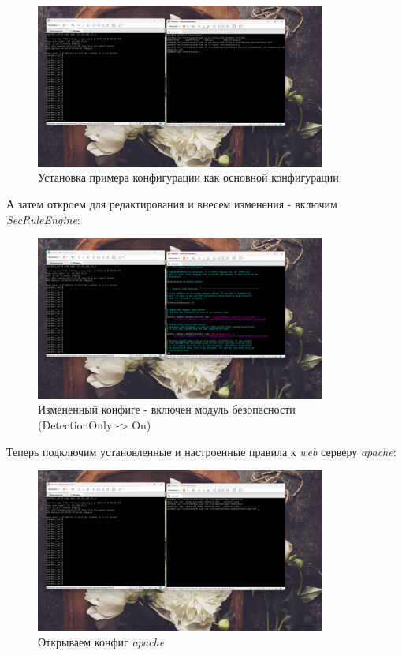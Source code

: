 \documentclass[a4paper]{article}
\begin{document}
  \begin{figure}[H]
    \centering
    \includegraphics[width=0.85\textwidth]{03_00 (56)}
    \caption{Установка примера конфигурации как основной конфигурации}
    \label{img:56}
  \end{figure}

  А затем откроем для редактирования и внесем изменения - включим \textit{SecRuleEngine}:

  \begin{figure}[H]
    \centering
    \includegraphics[width=0.85\textwidth]{03_00 (58)}
    \caption{Измененный конфиге - включен модуль безопасности (DetectionOnly -> On)}
    \label{img:58}
  \end{figure}

  Теперь подключим установленные и настроенные правила к \textit{web} серверу \textit{apache}:

  \begin{figure}[H]
    \centering
    \includegraphics[width=0.85\textwidth]{03_00 (59)}
    \caption{Открываем конфиг \textit{apache}}
    \label{img:59}
  \end{figure}
\end{document}
